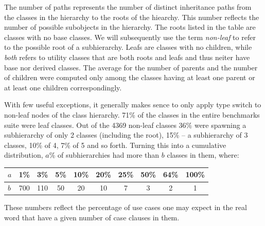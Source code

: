 The number of paths represents the number of distinct inheritance paths from the 
classes in the hierarchy to the roots of the hiearchy. This number reflects the number of possible subobjects in the 
hierarchy. The roots listed in the table are classes with no base classes. We 
will subsequently use the term \emph{non-leaf} to refer to the possible root of 
a subhierarchy. Leafs are classes with no children, while \emph{both} refers to 
utility classes that are both roots and leafs and thus neiter have base nor 
derived classes. The average for the number of parents and the number of 
children were computed only among the classes having at least one parent or at 
least one children correspondingly.

With few useful exceptions, it generally makes sence to only apply type switch 
to non-leaf nodes of the class hierarchy. 71\% of the classes in the entire 
benchmarks suite were leaf classes. Out of the 4369 non-leaf classes 36\% were 
spawning a subhierarchy of only 2 classes (including the root), 15\% -- a 
subhierarchy of 3 classes, 10\% of 4, 7\% of 5 and so forth. 
Turning this into a cumulative distribution, $a\%$ of subhierarchies had more 
than $b$ classes in them, where:

\noindent
\begin{tabular}
{l||@{ }c@{ }|@{ }c@{ }|@{ }c@{ }|@{ }c@{ }|@{ }c@{ }|@{ }c@{ }|@{ }c@{ }|@{ }c@{ }|@{ }c@{ }}
$a$ & 1\% & 3\% & 5\% & 10\% & 20\% & 25\% & 50\% & 64\% & 100\% \\
\hline %
$b$ & 700 & 110 & 50  & 20   & 10   & 7    & 3    & 2    & 1
\end{tabular}


\noindent
These numbers reflect the percentage of use cases one may expect in the real 
word that have a given number of case clauses in them.

